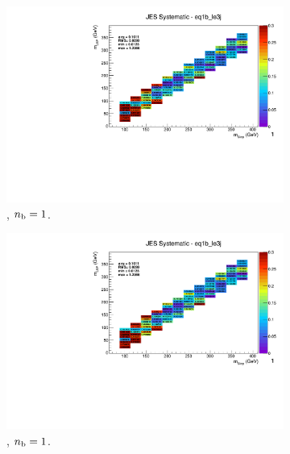 \begin{figure}[ht!]
\begin{subfigure}[b]{0.32\textwidth}
    \includegraphics[width=\textwidth, page=8]{Figs/sms/t2degen/v19/systs/T2_4body_JES_eq1b_le3j.pdf}
    \caption{\njlow, $n_{\text{b}} = 1$.}
  \end{subfigure}
  \begin{subfigure}[b]{0.32\textwidth}
    \includegraphics[width=\textwidth, page=1]{Figs/sms/t2degen/v19/systs/T2_4body_JES_eq1b_le3j.pdf}
    \caption{\njlow, $n_{\text{b}} = 1$.}
    \label{fig:sms-jes-tdegen-le3j-1b}
  \end{subfigure}\\
  \begin{subfigure}[b]{0.32\textwidth}

\end{subfigure}
\end{figure}
